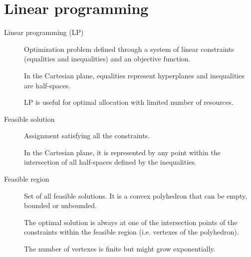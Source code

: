 \chapter{Linear programming}


\begin{description}
    \item[Linear programming (LP)] 
        Optimization problem defined through a system of linear constraints (equalities and inequalities) 
        and an objective function.

        In the Cartesian plane, equalities represent hyperplanes and inequalities are half-spaces.

        \begin{remark}
            LP is useful for optimal allocation with limited number of resources.
        \end{remark}

    
    \item[Feasible solution] 
        Assignment satisfying all the constraints.

        In the Cartesian plane, it is represented by any point within 
        the intersection of all half-spaces defined by the inequalities.

    \item[Feasible region] 
        Set of all feasible solutions.
        It is a convex polyhedron that can be empty, bounded or unbounded.

        \begin{remark}
            The optimal solution is always at one of the intersection points of the constraints within the feasible region (i.e. vertexes of the polyhedron).

            The number of vertexes is finite but might grow exponentially.
        \end{remark}


\end{description}
